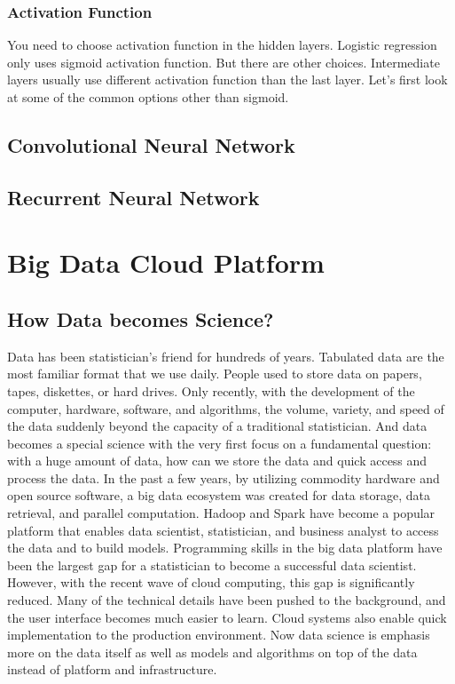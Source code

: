 \documentclass[12pt,]{krantz}
\theoremstyle{definition}
\theoremstyle{definition}
\theoremstyle{definition}
\theoremstyle{remark}
\begin{document}
\subsection{Activation Function}\label{activation-function}

You need to choose activation function in the hidden layers. Logistic
regression only uses sigmoid activation function. But there are other
choices. Intermediate layers usually use different activation function
than the last layer. Let's first look at some of the common options
other than sigmoid.

\section{Convolutional Neural
Network}\label{convolutional-neural-network}

\section{Recurrent Neural Network}\label{recurrent-neural-network}

\appendix {}


\chapter{Big Data Cloud Platform}\label{big-data-cloud-platform}

\section{How Data becomes Science?}\label{how-data-becomes-science}

Data has been statistician's friend for hundreds of years. Tabulated
data are the most familiar format that we use daily. People used to
store data on papers, tapes, diskettes, or hard drives. Only recently,
with the development of the computer, hardware, software, and
algorithms, the volume, variety, and speed of the data suddenly beyond
the capacity of a traditional statistician. And data becomes a special
science with the very first focus on a fundamental question: with a huge
amount of data, how can we store the data and quick access and process
the data. In the past a few years, by utilizing commodity hardware and
open source software, a big data ecosystem was created for data storage,
data retrieval, and parallel computation. Hadoop and Spark have become a
popular platform that enables data scientist, statistician, and business
analyst to access the data and to build models. Programming skills in
the big data platform have been the largest gap for a statistician to
become a successful data scientist. However, with the recent wave of
cloud computing, this gap is significantly reduced. Many of the
technical details have been pushed to the background, and the user
interface becomes much easier to learn. Cloud systems also enable quick
implementation to the production environment. Now data science is
emphasis more on the data itself as well as models and algorithms on top
of the data instead of platform and infrastructure.
\end{document}
